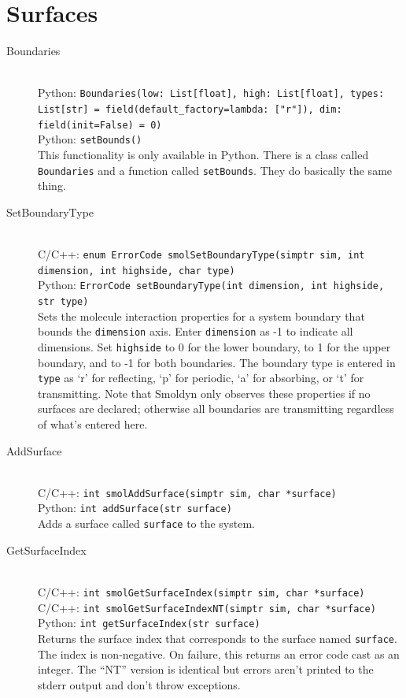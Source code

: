 \documentclass {scrbook}
\newcommand {\ttt} {\texttt}
\begin{document}
\section{Surfaces}

\begin{description}

\item[Boundaries]
\hfill \\
Python: \ttt{Boundaries(low: List[float], high: List[float], types: List[str] = field(default\_factory=lambda: ["r"]), dim: field(init=False) = 0)}\\
Python: \ttt{setBounds()}\\
This functionality is only available in Python. There is a class called \ttt{Boundaries} and a function called \ttt{setBounds}. They do basically the same thing.

\item[SetBoundaryType]
\hfill \\
C/C++: \ttt{enum ErrorCode smolSetBoundaryType(simptr sim, int dimension, int highside, char type)}\\
Python: \ttt{ErrorCode setBoundaryType(int dimension, int highside, str type)}\\
Sets the molecule interaction properties for a system boundary that bounds the \ttt{dimension} axis. Enter \ttt{dimension} as -1 to indicate all dimensions. Set \ttt{highside} to 0 for the lower boundary, to 1 for the upper boundary, and to -1 for both boundaries. The boundary type is entered in \ttt{type} as `r' for reflecting, `p' for periodic, `a' for absorbing, or `t' for transmitting. Note that Smoldyn only observes these properties if no surfaces are declared; otherwise all boundaries are transmitting regardless of what's entered here.

\item[AddSurface]
\hfill \\
C/C++: \ttt{int smolAddSurface(simptr sim, char *surface)}\\
Python: \ttt{int addSurface(str surface)}\\
Adds a surface called \ttt{surface} to the system.

\item[GetSurfaceIndex]
\hfill \\
C/C++: \ttt{int smolGetSurfaceIndex(simptr sim, char *surface)}\\
C/C++: \ttt{int smolGetSurfaceIndexNT(simptr sim, char *surface)}\\
Python: \ttt{int getSurfaceIndex(str surface)}\\
Returns the surface index that corresponds to the surface named \ttt{surface}. The index is non-negative. On failure, this returns an error code cast as an integer. The ``NT'' version is identical but errors aren't printed to the stderr output and don't throw exceptions.


\end{description}
\end{document}
